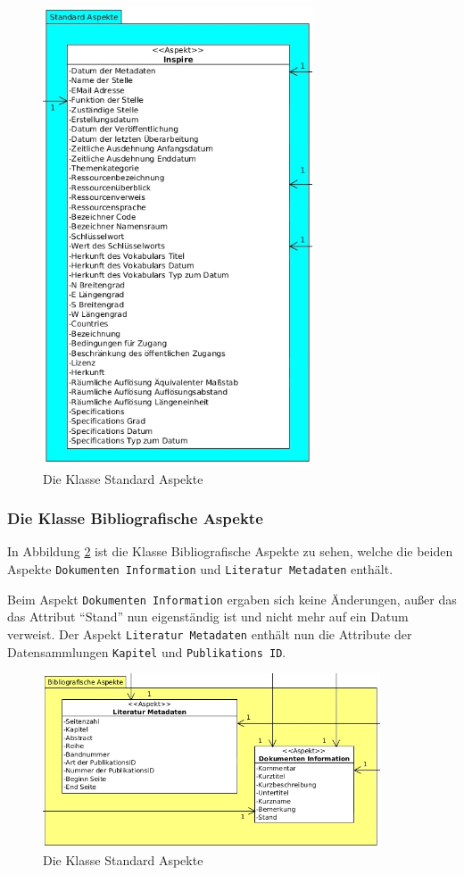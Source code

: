 \begin{figure}[!ht]
\centering
\includegraphics[width=8cm]{Bilder/AlfrescoModell/Standard-Aspekte.jpg}
\caption{Die Klasse Standard Aspekte}
\label{Klasse Standard Aspekte}
\centering
\end{figure}

\FloatBarrier
\subsubsection{Die Klasse Bibliografische Aspekte} \label{Die Klasse Bibliografische Aspekte}
In Abbildung \ref{Klasse Bibligrafische Aspekte} ist die Klasse Bibliografische Aspekte zu sehen, welche die beiden Aspekte \texttt{Dokumenten Information} und \texttt{Literatur Metadaten} enth\"alt.

Beim Aspekt \texttt{Dokumenten Information} ergaben sich keine \"Anderungen, au\ss{}er das das Attribut "`Stand"' nun eigenst\"andig ist und nicht mehr auf ein Datum verweist. Der Aspekt \texttt{Literatur Metadaten} enth\"alt nun die Attribute der Datensammlungen \texttt{Kapitel} und \texttt{Publikations ID}.

\begin{figure}[!ht]
\centering
\includegraphics[width=10cm]{Bilder/AlfrescoModell/Bibliografische-Aspekte.jpg}
\caption{Die Klasse Standard Aspekte}
\label{Klasse Bibligrafische Aspekte}
\centering
\end{figure}

